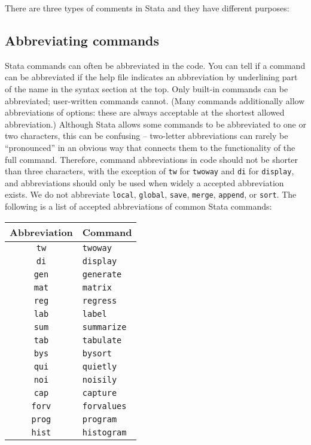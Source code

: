 There are three types of comments in Stata and they have different purposes:


\subsection{Abbreviating commands}

Stata commands can often be abbreviated in the code.
You can tell if a command can be abbreviated if the help file indicates an abbreviation by underlining part of the name in the syntax section at the top.
Only built-in commands can be abbreviated; user-written commands cannot.
(Many commands additionally allow abbreviations of options:
these are always acceptable at the shortest allowed abbreviation.)
Although Stata allows some commands to be abbreviated to one or two characters,
this can be confusing -- two-letter abbreviations can rarely be ``pronounced''
in an obvious way that connects them to the functionality of the full command.
Therefore, command abbreviations in code should not be shorter than three characters,
with the exception of \texttt{tw} for \texttt{twoway} and \texttt{di} for \texttt{display},
and abbreviations should only be used when widely a accepted abbreviation exists.
We do not abbreviate \texttt{local}, \texttt{global}, \texttt{save}, \texttt{merge}, \texttt{append}, or \texttt{sort}.
The following is a list of accepted abbreviations of common Stata commands:

\begin{center}
	\begin{tabular}{ c | l }
    Abbreviation & Command \\
		\hline
		\texttt{tw} & \texttt{twoway} \\
		\texttt{di} & \texttt{display} \\
		\texttt{gen} & \texttt{generate} \\
		\texttt{mat} & \texttt{matrix} \\
		\texttt{reg} & \texttt{regress} \\
		\texttt{lab} & \texttt{label} \\
		\texttt{sum} & \texttt{summarize} \\
		\texttt{tab} & \texttt{tabulate} \\
		\texttt{bys} & \texttt{bysort} \\
		\texttt{qui} & \texttt{quietly} \\
		\texttt{noi} & \texttt{noisily} \\
		\texttt{cap} & \texttt{capture} \\
		\texttt{forv} & \texttt{forvalues} \\
		\texttt{prog} & \texttt{program} \\
		\texttt{hist} & \texttt{histogram} \\
		\hline
	\end{tabular}
\end{center}

